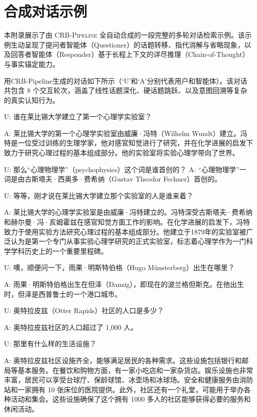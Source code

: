\section{合成对话示例}
\label{app:synthetic_dialogue}

本附录展示了由 \textsc{CRB-Pipeline} 全自动合成的一段完整的多轮对话检索示例。该示例生动呈现了提问者智能体（Questioner）的话题转移、指代消解与省略现象，以及回答者智能体（Responder）基于长程上下文的详尽推理（Chain-of-Thought）与事实锚定能力。

用CRB-Pipeline生成的对话如下所示（‘U’和‘A’分别代表用户和智能体）。该对话共包含 8 个交互轮次，涵盖了线性话题深化、硬话题跳跃、以及意图回溯等复杂的真实认知行为。

U: 谁在莱比锡大学建立了第一个心理学实验室？

A: 莱比锡大学的第一个心理学实验室由威廉·冯特（Wilhelm Wundt）建立。冯特是一位受过训练的生理学家，他对感官知觉进行了研究，并在化学进展的启发下致力于研究心理过程的基本组成部分。他的实验室将实验心理学带向了世界。

U: 那么“心理物理学”（psychophysics）这个词是谁首创的？
A: “心理物理学”一词是由古斯塔夫·西奥多·费希纳（Gustav Theodor Fechner）首创的。

U: 等等，刚才说在莱比锡大学建立那个实验室的人是谁来着？

A: 莱比锡大学的心理学实验室是由威廉·冯特建立的。冯特深受古斯塔夫·费希纳和赫尔曼·冯·亥姆霍兹在感官知觉方面工作的影响。在化学进展的启发下，冯特致力于使用实验方法研究心理过程的基本组成部分。他建立于1879年的实验室被广泛认为是第一个专门从事实验心理学研究的正式实验室，标志着心理学作为一门科学学科历史上的一个重要里程碑。

U: 噢，顺便问一下，雨果·明斯特伯格（Hugo Münsterberg）出生在哪里？

A: 雨果·明斯特伯格出生在但泽（Danzig），即现在的波兰格但斯克。在他出生时，但泽是西普鲁士的一个港口城市。

U: 奥特拉皮兹（Otter Rapids）社区的人口是多少？

A: 奥特拉皮兹社区的人口超过了 1,000 人。

U: 那里有什么样的生活设施？

A: 奥特拉皮兹社区设施齐全，能够满足居民的各种需求。这些设施包括银行和邮局等基本服务。在餐饮和购物方面，有一家小吃店和一家杂货店。娱乐设施也非常丰富，居民可以享受台球厅、保龄球馆、冰壶场和冰球场。安全和健康服务由消防站和一家拥有 10 张床位的医院提供。此外，社区还有一个礼堂，可能用于举办各种活动和集会。这些设施确保了这个拥有 1000 多人的社区能够获得必要的服务和休闲活动。

